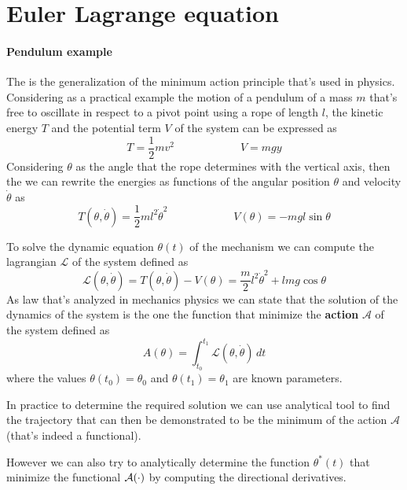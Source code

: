 \section{Euler Lagrange equation}
	\paragraph{Pendulum example} The  is the generalization of the minimum action principle that's used in physics. Considering as a practical example the motion of a pendulum of a mass $m$ that's free to oscillate in respect to a pivot point using a rope of length $l$, the kinetic energy $T$ and the potential term $V$ of the system can be expressed as
	\[ T = \frac 1 2 m v^2 \qquad \qquad \qquad V = mgy \]
	Considering $\theta$ as the angle that the rope determines with the vertical axis, then the we can rewrite the energies as functions of the angular position $\theta$ and velocity $\dot \theta$ as
	\[ T(\theta,\dot \theta) = \frac 1 2 m l^2 \dot\theta^2 \qquad \qquad \qquad V(\theta) = - m gl\sin\theta \]
	
	To solve the dynamic equation $\theta(t)$ of the mechanism we can compute the lagrangian $\mathcal L$ of the system defined as
	\[ \mathcal L(\theta,\dot\theta) = T(\theta,\dot\theta)-V(\theta) = \frac m 2 l^2\dot\theta^2 + lmg\cos\theta \]
	As law that's analyzed in mechanics physics we can state that the solution of the dynamics of the system is the one the function that minimize the \textbf{action} $\mathcal A$ of the system defined as
	\begin{equation} \label{eq:func:action}
		A(\theta) = \int_{t_0}^{t_1} \mathcal L(\theta,\dot\theta)\, dt
	\end{equation}
	where the values $\theta(t_0)= \theta_0$ and $\theta(t_1)=\theta_1$ are known parameters.
	
	In practice to determine the required solution we can use analytical tool to find the trajectory that can then be demonstrated to be the minimum of the action $\mathcal A$ (that's indeed a functional).
	
	However we can also try to analytically determine the function $\theta^*(t)$ that minimize the functional $\mathcal{A}(\cdot)$ by computing the directional derivatives. \vspace{3mm}
	
